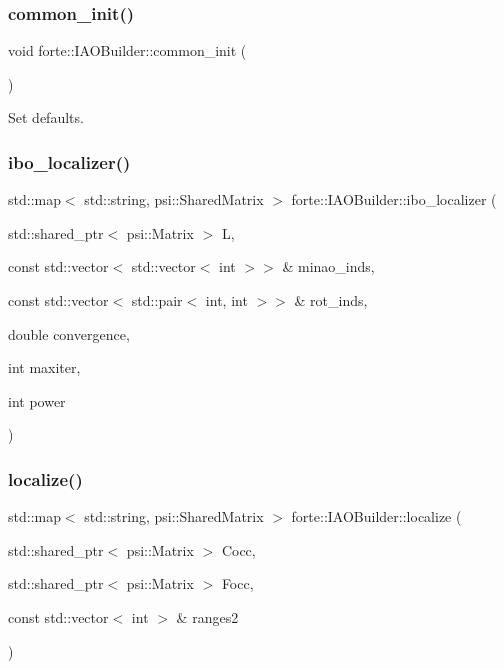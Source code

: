 \subsubsection{\texorpdfstring{common\+\_\+init()}{common\_init()}}
{\footnotesize\ttfamily void forte\+::\+I\+A\+O\+Builder\+::common\+\_\+init (\begin{DoxyParamCaption}{ }\end{DoxyParamCaption})\hspace{0.3cm}{\ttfamily [protected]}}



Set defaults. 

\mbox{\label{classforte_1_1_i_a_o_builder_a4f83305403a48c4f1b8462190f27ae88}} 
\subsubsection{\texorpdfstring{ibo\+\_\+localizer()}{ibo\_localizer()}}
{\footnotesize\ttfamily std\+::map$<$ std\+::string, psi\+::\+Shared\+Matrix $>$ forte\+::\+I\+A\+O\+Builder\+::ibo\+\_\+localizer (\begin{DoxyParamCaption}\item[{std\+::shared\+\_\+ptr$<$ psi\+::\+Matrix $>$}]{L,  }\item[{const std\+::vector$<$ std\+::vector$<$ int $>$$>$ \&}]{minao\+\_\+inds,  }\item[{const std\+::vector$<$ std\+::pair$<$ int, int $>$$>$ \&}]{rot\+\_\+inds,  }\item[{double}]{convergence,  }\item[{int}]{maxiter,  }\item[{int}]{power }\end{DoxyParamCaption})}

\mbox{\label{classforte_1_1_i_a_o_builder_af01e3de02b115e1552ee442e58102c1d}} 
\subsubsection{\texorpdfstring{localize()}{localize()}}
{\footnotesize\ttfamily std\+::map$<$ std\+::string, psi\+::\+Shared\+Matrix $>$ forte\+::\+I\+A\+O\+Builder\+::localize (\begin{DoxyParamCaption}\item[{std\+::shared\+\_\+ptr$<$ psi\+::\+Matrix $>$}]{Cocc,  }\item[{std\+::shared\+\_\+ptr$<$ psi\+::\+Matrix $>$}]{Focc,  }\item[{const std\+::vector$<$ int $>$ \&}]{ranges2 }\end{DoxyParamCaption})}

